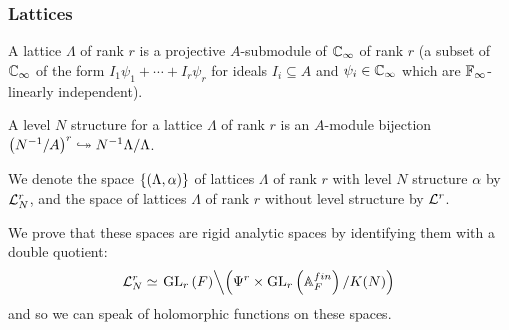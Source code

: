 \begin{frame} \frametitle{Lattices}
  \begin{definition}
    A lattice $\Lambda$ of rank $r$ is a projective $A$-submodule of $\CC_\infty$ of rank $r$ \pause (\ie a subset of $\CC_\infty$ of the form $I_1\psi_1 +\dotsb +I_r\psi_r$ for ideals $I_i \subseteq A$ and $\psi_i \in \CC_\infty$ which are $\FF_\infty$-linearly independent). \pause

    A level $N$ structure for a lattice $\Lambda$ of rank $r$ is an $A$-module bijection $\parens{N^{-1}/A}^r \ionto N^{-1}\Lambda/\Lambda$.
  \end{definition} \pause


  We denote the space $\set{(\Lambda,\alpha)}$ of lattices $\Lambda$ of rank $r$ with level $N$ structure $\alpha$ by $\LL_N^r$, and the space of lattices $\Lambda$ of rank $r$ without level structure by $\LL^r$. \pause

  We prove that these spaces are rigid analytic spaces by identifying them with a double quotient:
  \[ \LL_N^r \simeq \left. \GL[r]{F} \middle\backslash \parens{\Psi^r \times \GL[r]{\AA_F^{fin}}/K(N)} \right. \]
  and so we can speak of holomorphic functions on these spaces.
\end{frame}


